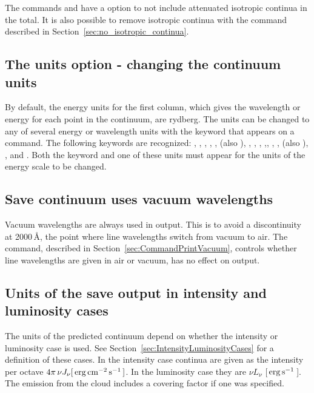The commands
 and
have a  option
to not include attenuated isotropic continua in the total.
It is also possible to remove isotropic continua with the
  command described
in Section~\ref{sec:no_isotropic_continua}.

\subsection{The units option - changing the continuum units}
\label{output_units}
\label{units_option}

By default, the energy units for the first column, which gives the
wavelength or energy for each point in the continuum, are rydberg.  The
units can be changed to any of several energy or wavelength units with the
 keyword that appears on a  command.  The following
keywords are recognized: , , ,
, ,  (also
), , , ,
,, , ,
 (also ), , and
.
Both the keyword  and one of
these units must appear for the units of the energy scale to be changed.

\subsection{Save continuum uses vacuum wavelengths}
Vacuum wavelengths are always used in  output.
This is to avoid a discontinuity at 2000\,\AA, the point where line wavelengths switch from
vacuum to air.
The  command, 
described in Section~\ref{sec:CommandPrintVacuum},
controls whether line wavelengths
are given in air or vacuum, has no effect on  output.

\subsection{Units of the save output in intensity and luminosity cases}
The units of the predicted continuum depend on whether the intensity
or luminosity case is used. See Section~\ref{sec:IntensityLuminosityCases} for a definition of these cases.
In the intensity
case continua are given as the intensity per octave
$ 4\pi \,\nu J_\nu [\mbox{${\rm\thinspace erg}{\rm\thinspace cm}^{-2}{\rm\thinspace s}^{-1}\,$} ]$.
In the luminosity case they are
$\nu L_\nu$
[$\mbox{${\rm\thinspace erg}{\rm\thinspace s}^{-1}\,$} $].
The emission from the cloud includes a covering factor if one was specified.

